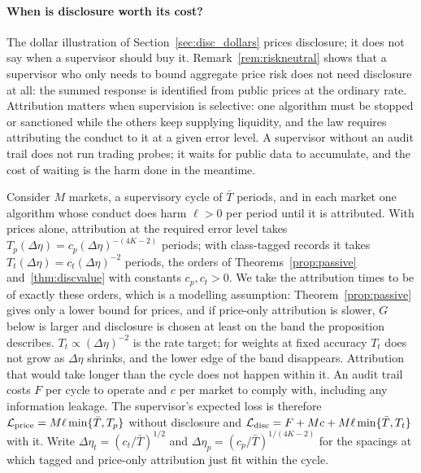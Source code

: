 \documentclass[12pt]{article}
\theoremstyle{definition}
\theoremstyle{remark}
\begin{document}
\paragraph{When is disclosure worth its cost?} The dollar illustration of Section~\ref{sec:disc_dollars} prices disclosure; it does not say when a supervisor should buy it. Remark~\ref{rem:riskneutral} shows that a supervisor who only needs to bound aggregate price risk does not need disclosure at all: the summed response is identified from public prices at the ordinary rate. Attribution matters when supervision is selective: one algorithm must be stopped or sanctioned while the others keep supplying liquidity, and the law requires attributing the conduct to it at a given error level. A supervisor without an audit trail does not run trading probes; it waits for public data to accumulate, and the cost of waiting is the harm done in the meantime.

Consider $M$ markets, a supervisory cycle of $\bar T$ periods, and in each market one algorithm whose conduct does harm $\ell>0$ per period until it is attributed. With prices alone, attribution at the required error level takes $T_p(\Delta\eta)=c_p(\Delta\eta)^{-(4K-2)}$ periods; with class-tagged records it takes $T_t(\Delta\eta)=c_t(\Delta\eta)^{-2}$ periods, the orders of Theorems~\ref{prop:passive} and~\ref{thm:discvalue} with constants $c_p,c_t>0$. We take the attribution times to be of exactly these orders, which is a modelling assumption: Theorem~\ref{prop:passive} gives only a lower bound for prices, and if price-only attribution is slower, $G$ below is larger and disclosure is chosen at least on the band the proposition describes. $T_t\propto(\Delta\eta)^{-2}$ is the rate target; for weights at fixed accuracy $T_t$ does not grow as $\Delta\eta$ shrinks, and the lower edge of the band disappears. Attribution that would take longer than the cycle does not happen within it. An audit trail costs $F$ per cycle to operate and $c$ per market to comply with, including any information leakage. The supervisor's expected loss is therefore $\mathcal L_{\rm price}=M\ell\min\{\bar T,T_p\}$ without disclosure and $\mathcal L_{\rm disc}=F+Mc+M\ell\min\{\bar T,T_t\}$ with it. Write $\Delta\eta_t=(c_t/\bar T)^{1/2}$ and $\Delta\eta_p=(c_p/\bar T)^{1/(4K-2)}$ for the spacings at which tagged and price-only attribution just fit within the cycle.
\end{document}
